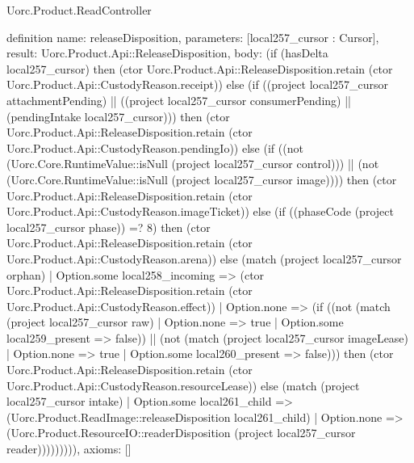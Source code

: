 \begin{lexlean}{Uorc.Product.ReadController}
\begin{semanticmodule}
definition{
  name: releaseDisposition,
  parameters: [local257_cursor : Cursor],
  result: Uorc.Product.Api::ReleaseDisposition,
  body: (if (hasDelta local257_cursor) then (ctor Uorc.Product.Api::ReleaseDisposition.retain (ctor Uorc.Product.Api::CustodyReason.receipt)) else (if ((project local257_cursor attachmentPending) || ((project local257_cursor consumerPending) || (pendingIntake local257_cursor))) then (ctor Uorc.Product.Api::ReleaseDisposition.retain (ctor Uorc.Product.Api::CustodyReason.pendingIo)) else (if ((not (Uorc.Core.RuntimeValue::isNull (project local257_cursor control))) || (not (Uorc.Core.RuntimeValue::isNull (project local257_cursor image)))) then (ctor Uorc.Product.Api::ReleaseDisposition.retain (ctor Uorc.Product.Api::CustodyReason.imageTicket)) else (if ((phaseCode (project local257_cursor phase)) =? 8) then (ctor Uorc.Product.Api::ReleaseDisposition.retain (ctor Uorc.Product.Api::CustodyReason.arena)) else (match (project local257_cursor orphan)
    | Option.some local258_incoming => (ctor Uorc.Product.Api::ReleaseDisposition.retain (ctor Uorc.Product.Api::CustodyReason.effect))
    | Option.none => (if ((not (match (project local257_cursor raw)
      | Option.none => true
      | Option.some local259_present => false)) || (not (match (project local257_cursor imageLease)
      | Option.none => true
      | Option.some local260_present => false))) then (ctor Uorc.Product.Api::ReleaseDisposition.retain (ctor Uorc.Product.Api::CustodyReason.resourceLease)) else (match (project local257_cursor intake)
      | Option.some local261_child => (Uorc.Product.ReadImage::releaseDisposition local261_child)
      | Option.none => (Uorc.Product.ResourceIO::readerDisposition (project local257_cursor reader))))))))),
  axioms: []
}


\end{semanticmodule}
\end{lexlean}
